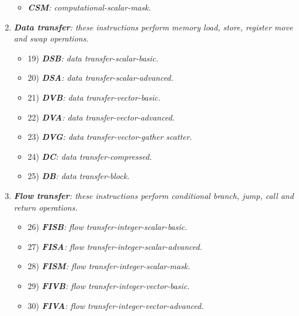 \begin{enumerate}
\begin{itemize}
                    \item \textit{\textbf{CSM}: computational-scalar-mask.}

                \end{itemize}

            \item \textit{\textbf{Data transfer}: these instructions perform memory load, store, register move and swap operations.}

                \begin{itemize}

                    \item 19) \textit{\textbf{DSB}: data transfer-scalar-basic.}
                    \item 20) \textit{\textbf{DSA}: data transfer-scalar-advanced.}

                    \item 21) \textit{\textbf{DVB}: data transfer-vector-basic.}
                    \item 22) \textit{\textbf{DVA}: data transfer-vector-advanced.}
                    \item 23) \textit{\textbf{DVG}: data transfer-vector-gather scatter.}

                    \item 24) \textit{\textbf{DC}: data transfer-compressed.}
                    \item 25) \textit{\textbf{DB}: data transfer-block.}

                \end{itemize}

            \item \textit{\textbf{Flow transfer}: these instructions perform conditional branch, jump, call and return operations.}

                \begin{itemize}

                    \item 26) \textit{\textbf{FISB}: flow transfer-integer-scalar-basic.}
                    \item 27) \textit{\textbf{FISA}: flow transfer-integer-scalar-advanced.}
                    \item 28) \textit{\textbf{FISM}: flow transfer-integer-scalar-mask.}

                    \item 29) \textit{\textbf{FIVB}: flow transfer-integer-vector-basic.}
                    \item 30) \textit{\textbf{FIVA}: flow transfer-integer-vector-advanced.}


\end{itemize}
\end{enumerate}
